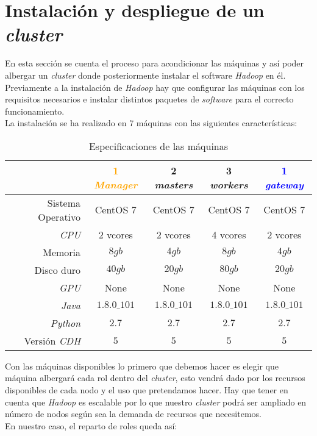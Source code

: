 
\chapter{Instalación y despliegue de un \textit{cluster}}
En esta sección se cuenta el proceso para acondicionar las máquinas y así poder albergar un \textit{cluster} donde 
posteriormente instalar el software \textit{Hadoop} en él.
Previamente a la instalación de \textit{Hadoop} hay que configurar las máquinas con los requisitos 
necesarios e instalar distintos paquetes de \textit{software} para el correcto funcionamiento.\\
La instalación se ha realizado en 7 máquinas con las siguientes características:

\begin{table}[!htbp]
  \centering
  \begin{tabular}{|r|c|c|c|c|} %
    \hline
    & \textcolor{Orange}{1 \textit{Manager}} & \textcolor{OliveGreen}{2 \textit{masters}} & \textcolor{BrickRed}{3 \textit{workers}} & \textcolor{blue}{1 \textit{gateway}} \\ \hline
    Sistema Operativo & CentOS 7 & CentOS 7 & CentOS 7 & CentOS 7 \\ \hline
    \textit{CPU} & 2 vcores & 2 vcores & 4 vcores & 2 vcores \\ \hline
    Memoria & $8gb$ & $4gb$ & $8gb$ & $4gb$ \\ \hline
    Disco duro & $40gb$ & $20gb$ & $80gb$ & $20gb$ \\ \hline
    \textit{GPU} & None & None & None & None \\ \hline
    \textit{Java} & $1.8.0\_101$ & $1.8.0\_101$ & $1.8.0\_101$ & $1.8.0\_101$ \\ \hline
    \textit{Python} & $2.7$ & $2.7$ & $2.7$ & $2.7$ \\ \hline
    Versión \textit{CDH} & $5$ & $5$ & $5$ & $5$ \\ \hline
  \end{tabular}
  \caption[\textit{Hardware} de las máquinas del \textit{cluster}]{Especificaciones de las máquinas}
  \label{cluster_machines_specification}
\end{table}

Con las máquinas disponibles lo primero que debemos hacer es elegir que máquina albergará cada rol dentro 
del \textit{cluster}, esto vendrá dado por los recursos disponibles de cada nodo y el uso que pretendamos hacer.
Hay que tener en cuenta que \textit{Hadoop} es escalable por lo que nuestro \textit{cluster} podrá 
ser ampliado en número de nodos según sea la demanda de recursos que necesitemos.\\
En nuestro caso, el reparto de roles queda así:

